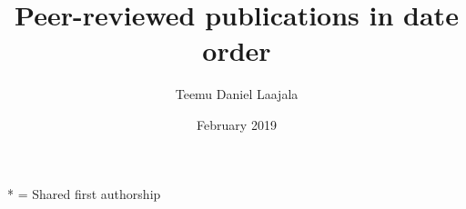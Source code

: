 \documentclass{article}
\title{Peer-reviewed publications in date order}
\author{Teemu Daniel Laajala}
\date{February 2019}
\begin{document}
\maketitle

\nocite{*}

* = Shared first authorship

\vspace*{-1cm}



\end{document}
